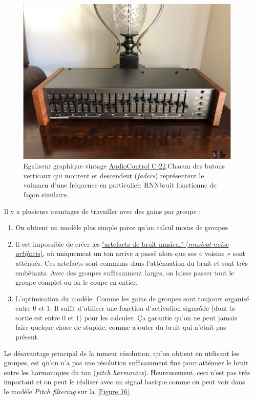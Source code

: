 \documentclass[conference,onecolumn]{IEEEtran}
\begin{document}
 \begin{figure}[H]
 \centering
    \includegraphics[scale=0.2]{22bEq.jpg}
    \caption{Egaliseur graphique vintage \href{https://www.canuckaudiomart.com/details/649586296-vintage-audio-control-c-22-octave-10-band-equalizer/images/2554905/}{AudioControl C-22}.Chacun des butons verticaux qui montent et descendent (\textit{faders}) représentent le volumen d’une fréquence en particulier; RNNbruit fonctionne de façon similaire.} 
\end{figure}
Il y a plusieurs avantages de travailler avec des gains par groupe :
\begin{enumerate}
    \item On obtient un modèle plus simple parce qu’on calcul moins de groupes
 \item Il est impossible de créer les  \href{https://www.vocal.com/noise-reduction/musical-noise/}{"artefacts de bruit musical" (\textit{musical noise artifacts})}, où uniquement un ton arrive a passé alors que ses « voisins » sont atténués. Ces artefacts sont communs dans l’atténuation du bruit et sont très embêtants. Avec des groupes suffisamment larges, on laisse passer tout le groupe complet ou on le coupe en entier.
    \item L’optimisation du modèle. Comme les gains de groupes sont toujours organisé entre $0$ et $1$. Il suffit d’utiliser une fonction d’activation sigmoïde (dont la sortie est entre $0$ et $1$) pour les calculer. Ça garantie qu’on ne peut jamais faire quelque chose de stupide, comme ajouter du bruit qui n’était pas présent.  
\end{enumerate}
Le désavantage principal de la mineur résolution, qu’on obtient en utilisant les groupes, est qu’on n’a pas une résolution suffisamment fine pour atténuer le bruit entre les harmoniques du ton (\textit{pitch harmonics}). Heureusement, ceci n’est pas très important et on peut le réaliser avec un signal basique comme on peut voir dans le modèle \textit{Pitch filtering} sur la \ref{Figure 16}.
\end{document}
